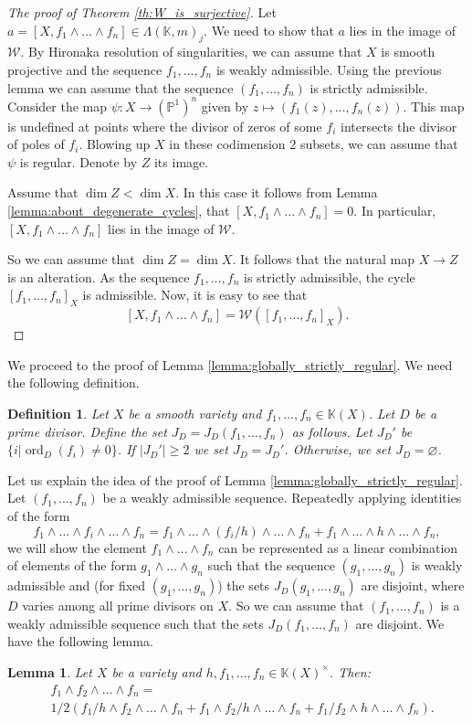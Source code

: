 \documentclass[12pt]{extarticle}
\newtheorem{lemma}[theorem]{Lemma}
\newtheorem{definition}[theorem]{Definition}
\def\mb{\mathbb}
\def\mc{\mathcal}
\def\L{\Lambda}
\def\k{\mb K}
\def\t{\times}
\def\wdw{\wedge\dots\wedge}
\DeclareMathOperator{\ord}{ord}
\begin{document}
\begin{proof}[The proof of Theorem \ref{th:W_is_surjective}] Let $a=[X,f_1\wdw f_n]\in\L(\k,m)_j$. We need to show that $a$ lies in the image of $\mc W$. By Hironaka resolution of singularities, we can assume that $X$ is smooth projective and the sequence $f_1,\dots, f_n$ is weakly admissible. Using the previous lemma we can assume that the sequence $(f_1,\dots, f_n)$ is strictly admissible. Consider the map $\psi\colon X\to (\mb P^1)^n$ given by $z\mapsto (f_1(z),\dots, f_n(z))$. This map is undefined at points where the divisor of zeros of some $f_i$ intersects the divisor of poles of $f_i$. Blowing up $X$ in these codimension $2$ subsets, we can assume that $\psi$ is regular.  Denote by $Z$ its image. 

Assume that $\dim Z<\dim X$. In this case it follows from Lemma \ref{lemma:about_degenerate_cycles}, that $[X,f_1\wdw f_n]=0$. In particular, $[X,f_1\wdw f_n]$ lies in the image of $\mc W$.

So we can assume that $\dim Z=\dim X$. It follows that the natural map $X\to Z$ is an alteration. As the sequence $f_1,\dots, f_n$ is strictly admissible, the cycle $[f_1,\dots, f_n]_X$ is admissible. Now, it is easy to see that $$[X,f_1\wdw f_n]=\mc W([f_1,\dots, f_n]_X).$$
\end{proof}



We proceed to the proof of Lemma \ref{lemma:globally_strictly_regular}. We need the following definition.
\begin{definition}
\label{def:J}
    Let $X$ be a smooth variety and $f_1,\dots, f_n\in\k(X)$. Let $D$ be a prime divisor. Define the set $J_D=J_D(f_1,\dots, f_n)$ as follows. Let $J_D'$ be $\{i|\ord_D(f_i)\ne 0\}$. If $|J_D'|\geq 2$ we set $J_D=J_{D}'$. Otherwise, we set $J_D=\varnothing$.
\end{definition}

Let us explain the idea of the proof of Lemma \ref{lemma:globally_strictly_regular}. Let $(f_1,\dots,f_n)$ be a weakly admissible sequence. Repeatedly applying identities of the form 
$$f_1\wedge\dots\wedge f_i\wdw f_n=f_1\wdw (f_i/h)\wdw f_n+f_1\wdw h\wdw f_n,$$
we will show the element $f_1\wdw f_n$ can be represented as a linear combination of elements of the form $g_1\wdw g_n$ such that the sequence $(g_1,\dots, g_n)$ is weakly admissible and (for fixed $(g_1,\dots, g_n)$) the sets $J_D(g_1,\dots, g_n)$ are disjoint, where $D$ varies among all prime divisors on $X$. So we can assume that $(f_1,\dots, f_n)$ is a weakly admissible sequence such that the sets $J_D(f_1,\dots, f_n)$ are disjoint. We have the following lemma.
\begin{lemma}
\label{lemma:formula}
Let $X$ be a variety  and $h, f_1,\dots, f_n\in \k(X)^\t$. Then:
\begin{align*}
    &f_1\wedge f_2\wdw f_n=\\&1/2(f_1/h\wedge f_2\wdw f_n+f_1\wedge f_2/h\wdw f_n+f_1/f_2\wedge h\wdw f_n).
\end{align*}
\end{lemma}
\end{document}
